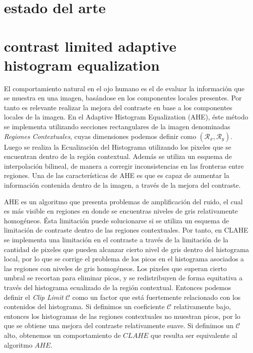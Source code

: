 \documentclass[spanish]{article}
\begin{document}
\section{estado del arte}

\section{contrast limited adaptive histogram equalization}
\label{sec:clahe}

El comportamiento natural en el ojo humano es el de evaluar la información que se muestra en una imagen, basándose en los componentes locales presentes. Por tanto es relevante realizar la mejora del contraste en base a los componentes locales de la imagen. En el Adaptive Histogram Equalization (AHE), éste método se implementa utilizando secciones rectangulares de la imagen denominadas {\it Regiones Contextuales}, cuyas dimensiones podemos definir como $(\mathcal{R}_x, \mathcal{R}_y)$. Luego se realiza la Ecualización del Histograma utilizando los pixeles que se encuentran dentro de la región contextual. Además se utiliza un esquema de interpolación bilineal, de manera a corregir inconsistencias en las fronteras entre regiones. Una de las características de AHE es que es capaz de aumentar la información contenida dentro de la imagen, a través de la mejora del contraste\cite{zimmerman1988evaluation}.

AHE es un algoritmo que presenta problemas de amplificación del ruido, el cual es más visible en regiones en donde se encuentras niveles de gris relativamente homogéneos. Ésta limitación puede solucionarse si se utiliza un esquema de limitación de contraste dentro de las regiones contextuales. Por tanto, en CLAHE se implementa una limitación en el contraste a través de la limitación de la cantidad de pixeles que pueden alcanzar cierto nivel de gris dentro del histograma local, por lo que se corrige el problema de los picos en el histograma asociados a las regiones con niveles de gris homogéneos. Los pixeles que superan cierto umbral se recortan para eliminar picos, y se redistribuyen de forma equitativa a través del histograma ecualizado de la región contextual. Entonces podemos definir el {\it Clip Limit} $\mathcal{C}$ como un factor que está fuertemente relacionado con los contenidos del histograma. Si definimos un coeficiente $\mathcal{C}$ relativamente bajo, entonces los histogramas de las regiones contextuales no muestran picos, por lo que se obtiene una mejora del contraste relativamente suave. Si definimos un $\mathcal{C}$ alto, obtenemos un comportamiento de $CLAHE$ que resulta ser equivalente al algoritmo $AHE$.
\end{document}
